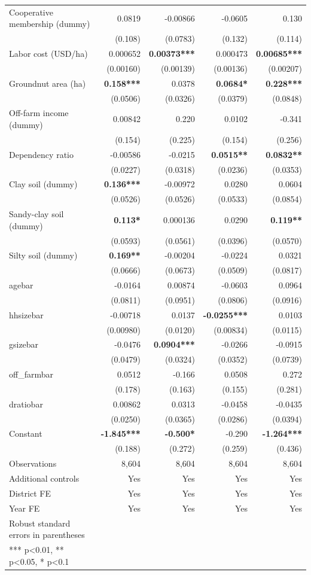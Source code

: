 \documentclass[
]{article}
\begin{document}
\begin{longtable}[t]{lrrrr}
Cooperative membership (dummy) & 0.0819 & -0.00866 & -0.0605 & 0.130\\
 & (0.108) & (0.0783) & (0.132) & (0.114)\\
Labor cost (USD/ha) & 0.000652 & \textbf{0.00373***} & 0.000473 & \textbf{0.00685***}\\
 & (0.00160) & (0.00139) & (0.00136) & (0.00207)\\
Groundnut area (ha) & \textbf{0.158***} & 0.0378 & \textbf{0.0684*} & \textbf{0.228***}\\
 & (0.0506) & (0.0326) & (0.0379) & (0.0848)\\
Off-farm income (dummy) & 0.00842 & 0.220 & 0.0102 & -0.341\\
 & (0.154) & (0.225) & (0.154) & (0.256)\\
Dependency ratio & -0.00586 & -0.0215 & \textbf{0.0515**} & \textbf{0.0832**}\\
 & (0.0227) & (0.0318) & (0.0236) & (0.0353)\\
Clay soil (dummy) & \textbf{0.136***} & -0.00972 & 0.0280 & 0.0604\\
 & (0.0526) & (0.0526) & (0.0533) & (0.0854)\\
Sandy-clay soil (dummy) & \textbf{0.113*} & 0.000136 & 0.0290 & \textbf{0.119**}\\
 & (0.0593) & (0.0561) & (0.0396) & (0.0570)\\
Silty soil (dummy) & \textbf{0.169**} & -0.00204 & -0.0224 & 0.0321\\
 & (0.0666) & (0.0673) & (0.0509) & (0.0817)\\
agebar & -0.0164 & 0.00874 & -0.0603 & 0.0964\\
 & (0.0811) & (0.0951) & (0.0806) & (0.0916)\\
hhsizebar & -0.00718 & 0.0137 & \textbf{-0.0255***} & 0.0103\\
 & (0.00980) & (0.0120) & (0.00834) & (0.0115)\\
gsizebar & -0.0476 & \textbf{0.0904***} & -0.0266 & -0.0915\\
 & (0.0479) & (0.0324) & (0.0352) & (0.0739)\\
off\_farmbar & 0.0512 & -0.166 & 0.0508 & 0.272\\
 & (0.178) & (0.163) & (0.155) & (0.281)\\
dratiobar & 0.00862 & 0.0313 & -0.0458 & -0.0435\\
 & (0.0250) & (0.0365) & (0.0286) & (0.0394)\\
Constant & \textbf{-1.845***} & \textbf{-0.500*} & -0.290 & \textbf{-1.264***}\\
\midrule
 & (0.188) & (0.272) & (0.259) & (0.436)\\
Observations & 8,604 & 8,604 & 8,604 & 8,604\\
Additional controls & Yes & Yes & Yes & Yes\\
District FE & Yes & Yes & Yes & Yes\\
Year FE & Yes & Yes & Yes & Yes\\
\midrule
Robust standard errors in parentheses &  &  &  & \\
*** p<0.01, ** p<0.05, * p<0.1 &  &  &  & \\*
\end{longtable}
\endgroup{}
\end{document}

